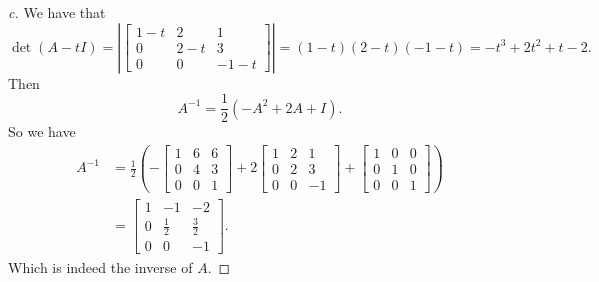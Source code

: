 \documentclass[leqno]{article}
\theoremstyle{nonumberplain}
\newtheorem{proof}{Proof}
\begin{document}
\begin{proof}[c]
We have that
\[
\det(A-t I)=
\left| \begin{bmatrix}
1-t & 2 & 1\\
0 & 2-t & 3\\
0 & 0 & -1-t
\end{bmatrix} \right|=(1-t)(2-t)(-1-t)=-t^3+2t^2+t-2.
\]
Then
\[
A^{-1}=\frac{1}{2}(-A^2+2A+I).
\]
So we have
\begin{align*}
A^{-1}&= \frac{1}{2}\left(-
\begin{bmatrix}
1 & 6 & 6\\
0 & 4 & 3\\
0 & 0 & 1
\end{bmatrix}
+2
\begin{bmatrix}
1 & 2 & 1\\
0 & 2 & 3\\
0 & 0 & -1
\end{bmatrix}
+
\begin{bmatrix}
1 & 0 & 0\\
0 & 1 & 0\\
0 & 0 & 1
\end{bmatrix}\right)\\
&=
\begin{bmatrix}
1 & -1 & -2\\
0 & \frac{1}{2} & \frac{3}{2}\\
0 & 0 & -1
\end{bmatrix}.
\end{align*}
Which is indeed the inverse of $A$.
\end{proof}

\pagebreak
\end{document}
